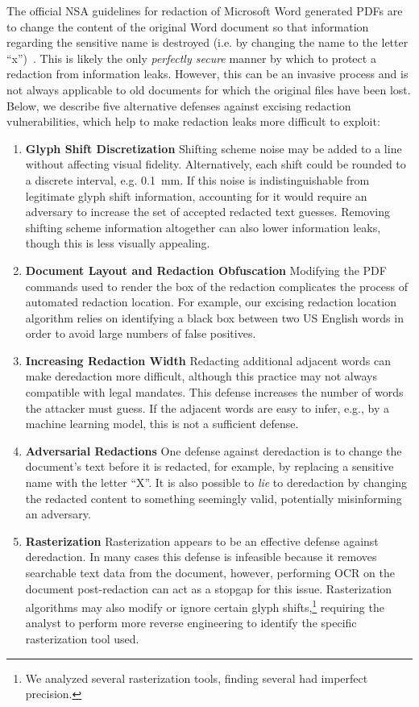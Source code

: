 The official NSA guidelines for redaction of Microsoft Word generated PDFs are to change the content of the original Word document so that information regarding the sensitive name is destroyed (i.e. by changing the name to the letter ``x'')~\cite{nsaRedact}.
This is likely the only \emph{perfectly secure} manner by which to protect a redaction from information leaks.
However, this can be an invasive process and is not always applicable to old documents for which the original files have been lost.
Below, we describe five alternative defenses against excising redaction vulnerabilities, which help to make redaction leaks more difficult to exploit:
\begin{enumerate}
\item \textbf{Glyph Shift Discretization}
Shifting scheme noise may be added to a line without affecting visual fidelity.
Alternatively, each shift could be rounded to a discrete interval, e.g. 0.1~mm.
If this noise is indistinguishable from legitimate glyph shift information, accounting for it would require an adversary to increase the set of accepted redacted text guesses.
Removing shifting scheme information altogether can also lower information leaks, though this is less visually appealing.
\item \textbf{Document Layout and Redaction Obfuscation}
Modifying the PDF commands used to render the box of the redaction complicates the process of automated redaction location.
For example, our excising redaction location algorithm relies on identifying a black box between two US English words in order to avoid large numbers of false positives.
\item \textbf{Increasing Redaction Width} 
Redacting additional adjacent words can make deredaction more difficult, although this practice may not always compatible with legal mandates.
This defense increases the number of words the attacker must guess. 
If the adjacent words are easy to infer, e.g., by a machine learning model, this is not a sufficient defense.
\item \textbf{Adversarial Redactions} 
One defense against deredaction is to change the document's text before it is redacted, for example, by replacing a sensitive name with the letter ``X''.
It is also possible to \emph{lie} to deredaction by changing the redacted content to something seemingly valid, potentially misinforming an adversary.
\item \textbf{Rasterization} 
Rasterization appears to be an effective defense against deredaction.
In many cases this defense is infeasible because it removes searchable text data from the document, however, performing OCR on the document post-redaction can act as a stopgap for this issue.
Rasterization algorithms may also modify or ignore certain glyph shifts,\footnote{We analyzed several rasterization tools, finding several had imperfect precision.} requiring the analyst to perform more reverse engineering to identify the specific rasterization tool used.
\end{enumerate}

